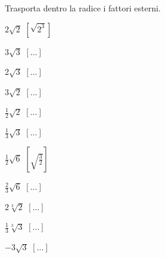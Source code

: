 
\begin{esercizio}[\Ast]
 \label{ese:2.40}
Trasporta dentro la radice i fattori esterni.
 \begin{multicols}{4}
 \begin{enumeratea}
 \item \(2\sqrt 2\)
  \hfill \(\left[\sqrt{2^3}\right]\)
 \item \(3\sqrt 3\)
  \hfill \(\left[...\right]\)
 \item \(2\sqrt 3\)
  \hfill \(\left[...\right]\)
 \item \(3\sqrt 2\)
  \hfill \(\left[...\right]\)
 \item \(\frac 1 2\sqrt 2\)
  \hfill \(\left[...\right]\)
 \item \(\frac 1 3\sqrt 3\)
  \hfill \(\left[...\right]\)
 \item \(\frac 1 2\sqrt 6\)
  \hfill \(\left[\sqrt{\frac 3 2}\right]\)
 \item \(\frac 2 3\sqrt 6\)
  \hfill \(\left[...\right]\)
 \item \(2\sqrt[3]2\)
  \hfill \(\left[...\right]\)
 \item \(\frac 1 3\sqrt[3]3\)
  \hfill \(\left[...\right]\)
 \item \(-3\sqrt 3\)
  \hfill \(\left[...\right]\)
 \end{enumeratea}
 \end{multicols}
\end{esercizio}

